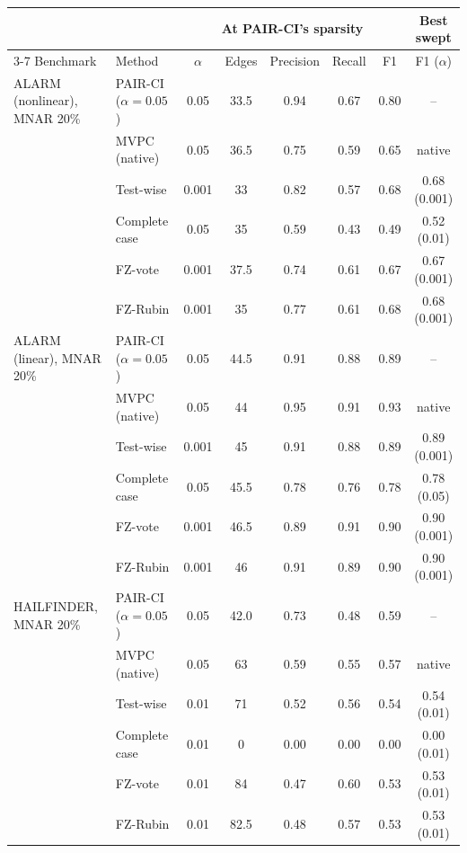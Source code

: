 \begin{tabular}{llccccc|c}
    \toprule
     & & \multicolumn{5}{c}{At PAIR-CI's sparsity} & Best swept \\
    \cmidrule(lr){3-7}
    Benchmark & Method & $\alpha$ & Edges & Precision & Recall & F1 & F1 ($\alpha$) \\
    \midrule
    ALARM (nonlinear), MNAR 20\%     & PAIR-CI ($\alpha{=}0.05$)  & 0.05 & 33.5 & 0.94 & 0.67 & 0.80 & -- \\
                                     & MVPC (native)              & 0.05 & 36.5 & 0.75 & 0.59 & 0.65 & native \\
                                     & Test-wise                  & 0.001 & 33 & 0.82 & 0.57 & 0.68 & 0.68 (0.001) \\
                                     & Complete case              & 0.05 & 35 & 0.59 & 0.43 & 0.49 & 0.52 (0.01) \\
                                     & FZ-vote                    & 0.001 & 37.5 & 0.74 & 0.61 & 0.67 & 0.67 (0.001) \\
                                     & FZ-Rubin                   & 0.001 & 35 & 0.77 & 0.61 & 0.68 & 0.68 (0.001) \\
    \midrule
    ALARM (linear), MNAR 20\%        & PAIR-CI ($\alpha{=}0.05$)  & 0.05 & 44.5 & 0.91 & 0.88 & 0.89 & -- \\
                                     & MVPC (native)              & 0.05 & 44 & 0.95 & 0.91 & 0.93 & native \\
                                     & Test-wise                  & 0.001 & 45 & 0.91 & 0.88 & 0.89 & 0.89 (0.001) \\
                                     & Complete case              & 0.05 & 45.5 & 0.78 & 0.76 & 0.78 & 0.78 (0.05) \\
                                     & FZ-vote                    & 0.001 & 46.5 & 0.89 & 0.91 & 0.90 & 0.90 (0.001) \\
                                     & FZ-Rubin                   & 0.001 & 46 & 0.91 & 0.89 & 0.90 & 0.90 (0.001) \\
    \midrule
    HAILFINDER, MNAR 20\%            & PAIR-CI ($\alpha{=}0.05$)  & 0.05 & 42.0 & 0.73 & 0.48 & 0.59 & -- \\
                                     & MVPC (native)              & 0.05 & 63 & 0.59 & 0.55 & 0.57 & native \\
                                     & Test-wise                  & 0.01 & 71 & 0.52 & 0.56 & 0.54 & 0.54 (0.01) \\
                                     & Complete case              & 0.01 & 0 & 0.00 & 0.00 & 0.00 & 0.00 (0.01) \\
                                     & FZ-vote                    & 0.01 & 84 & 0.47 & 0.60 & 0.53 & 0.53 (0.01) \\
                                     & FZ-Rubin                   & 0.01 & 82.5 & 0.48 & 0.57 & 0.53 & 0.53 (0.01) \\
    \bottomrule
\end{tabular}
